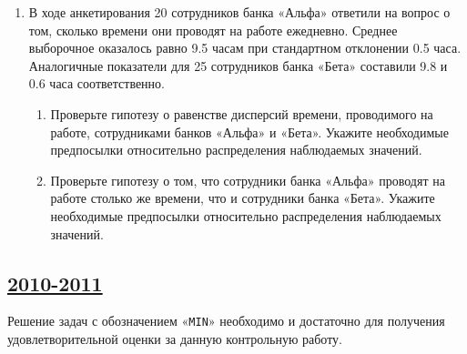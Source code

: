 \begin{enumerate}
\item В ходе анкетирования 20 сотрудников банка «Альфа» ответили на вопрос о том, сколько времени они проводят на работе ежедневно. Среднее выборочное оказалось равно 9.5 часам при стандартном отклонении 0.5 часа. Аналогичные показатели для 25 сотрудников банка «Бета» составили 9.8 и 0.6 часа соответственно.
\begin{enumerate}
\item Проверьте гипотезу о равенстве дисперсий времени, проводимого на работе, сотрудниками банков «Альфа» и «Бета». Укажите необходимые предпосылки относительно распределения наблюдаемых значений.
\item Проверьте гипотезу о том, что сотрудники банка «Альфа» проводят на работе столько же времени, что и сотрудники банка «Бета». Укажите необходимые предпосылки относительно распределения наблюдаемых значений.
\end{enumerate}
\end{enumerate}


\subsection[2010-2011]{\hyperref[sec:sol_kr_03_2010_2011]{2010-2011}}
\label{sec:kr_03_2010_2011}

Решение задач с обозначением «\verb|MIN|» необходимо и достаточно для получения удовлетворительной оценки за данную контрольную работу.\par\smallskip

